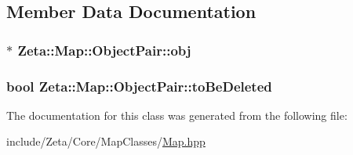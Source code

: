 \subsection{Member Data Documentation}
\hypertarget{classZeta_1_1Map_1_1ObjectPair_a381c6e43cf2fbc05383bcd3f3cb6067a}{
\subsubsection[{obj}]{$\ast$ Zeta\+::\+Map\+::\+Object\+Pair\+::obj\hspace{0.3cm}{\ttfamily [private]}}}\label{classZeta_1_1Map_1_1ObjectPair_a381c6e43cf2fbc05383bcd3f3cb6067a}
\hypertarget{classZeta_1_1Map_1_1ObjectPair_a4ce67245e31ab1c72a52eb97c2e2ca8c}{
\subsubsection[{to\+Be\+Deleted}]{\setlength{\rightskip}{0pt plus 5cm}bool Zeta\+::\+Map\+::\+Object\+Pair\+::to\+Be\+Deleted\hspace{0.3cm}{\ttfamily [private]}}}\label{classZeta_1_1Map_1_1ObjectPair_a4ce67245e31ab1c72a52eb97c2e2ca8c}


The documentation for this class was generated from the following file\+:\begin{DoxyCompactItemize}
\item 
include/\+Zeta/\+Core/\+Map\+Classes/\hyperlink{Map_8hpp}{Map.\+hpp}\end{DoxyCompactItemize}
